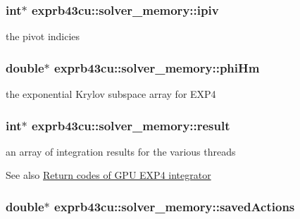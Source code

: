\subsubsection[{\texorpdfstring{ipiv}{ipiv}}]{\setlength{\rightskip}{0pt plus 5cm}int$\ast$ exprb43cu\+::solver\+\_\+memory\+::ipiv}\hypertarget{structexprb43cu_1_1solver__memory_ad00e33aaa4241cc8356ea30869d311ff}{}\label{structexprb43cu_1_1solver__memory_ad00e33aaa4241cc8356ea30869d311ff}


the pivot indicies 

\subsubsection[{\texorpdfstring{phi\+Hm}{phiHm}}]{\setlength{\rightskip}{0pt plus 5cm}double$\ast$ exprb43cu\+::solver\+\_\+memory\+::phi\+Hm}\hypertarget{structexprb43cu_1_1solver__memory_aebb83d142ab8d04edad3538544c67ec4}{}\label{structexprb43cu_1_1solver__memory_aebb83d142ab8d04edad3538544c67ec4}


the exponential Krylov subspace array for E\+X\+P4 

\subsubsection[{\texorpdfstring{result}{result}}]{\setlength{\rightskip}{0pt plus 5cm}int$\ast$ exprb43cu\+::solver\+\_\+memory\+::result}\hypertarget{structexprb43cu_1_1solver__memory_a69d7ae536d679306d284b461a8bdb2c3}{}\label{structexprb43cu_1_1solver__memory_a69d7ae536d679306d284b461a8bdb2c3}


an array of integration results for the various threads 

\begin{DoxySeeAlso}{See also}
\hyperlink{group__exprb43cu__ErrCodes}{Return codes of G\+P\+U E\+X\+P4 integrator} 
\end{DoxySeeAlso}
\subsubsection[{\texorpdfstring{saved\+Actions}{savedActions}}]{\setlength{\rightskip}{0pt plus 5cm}double$\ast$ exprb43cu\+::solver\+\_\+memory\+::saved\+Actions}\hypertarget{structexprb43cu_1_1solver__memory_aee268d381ce2f3ab02754793dfd068ee}{}\label{structexprb43cu_1_1solver__memory_aee268d381ce2f3ab02754793dfd068ee}


